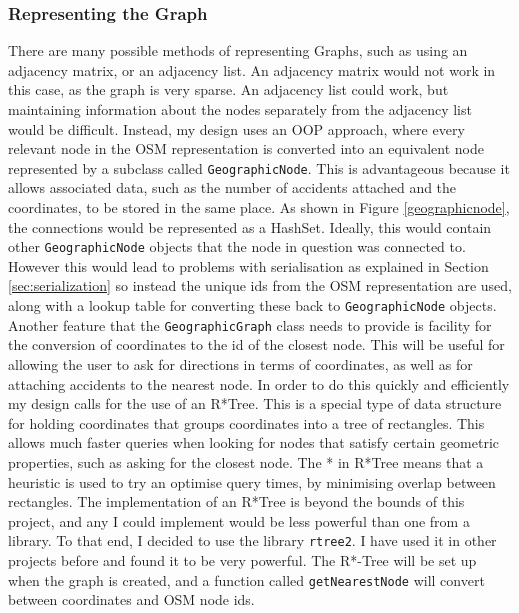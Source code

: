 \documentclass[11pt,twoside,a4paper]{report}
\begin{document}
\subsubsection{Representing the Graph}
\label{Rtree}
There are many possible methods of representing Graphs, such as using an adjacency matrix, or an adjacency list. An adjacency matrix would not work in this case, as the graph is very sparse. An adjacency list could work, but maintaining information about the nodes 
separately from the adjacency list would be difficult. Instead, my design uses an OOP approach, where every relevant node in the OSM representation is converted into an equivalent node represented by a subclass called \texttt{GeographicNode}.
This is advantageous because it allows associated data, such as the number of accidents attached and the coordinates, to be stored in the same place. As shown in Figure \ref{geographicnode}, the connections would be represented as a HashSet. Ideally, this would contain
other \texttt{GeographicNode} objects that the node in question was connected to. However this would lead to problems with serialisation as explained in Section \ref{sec:serialization} so instead the unique ids from the OSM representation are used,
along with a lookup table for converting these back to \texttt{GeographicNode} objects.\\
Another feature that the \texttt{GeographicGraph} class needs to provide is facility for the conversion of coordinates to the id of the closest node. This will be useful for allowing the user to ask for directions in terms of coordinates,
as well as for attaching accidents to the nearest node.
In order to do this quickly and efficiently my design calls for the use of an R*Tree\cite{Beckmann1990}. This is a special type of data structure for holding coordinates that groups coordinates into a tree of rectangles. This allows much faster queries when looking for nodes that satisfy certain geometric properties, such as asking for the closest node.
The * in R*Tree means that a heuristic is used to try an optimise query times, by minimising overlap between rectangles. 
The implementation of an R*Tree is beyond the bounds of this project, and any I could implement would be less powerful than one from a library. To that end, I decided to use the library \texttt{rtree2}\cite{rtree}. I have used it in other projects before and found it to be very powerful. The R*-Tree will be set up when the graph is created, and a 
function called \texttt{getNearestNode} will convert between coordinates and OSM node ids. 
\end{document}
